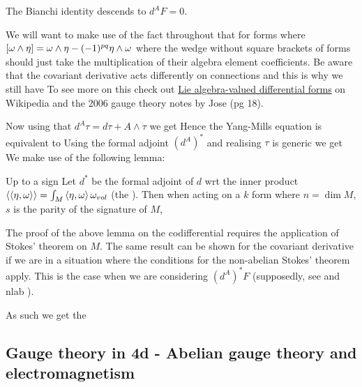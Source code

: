 \documentclass{article}
\begin{document}
\begin{corollary}
	The Bianchi identity descends to $d^A F = 0$. 
\end{corollary}

\begin{remark}
	We will want to make use of the fact throughout that for forms 
where $\left[ \omega \wedge \eta \right] = \omega \wedge \eta - (-1)^{pq} \eta \wedge \omega$ where the wedge without square brackets of forms should just take the multiplication of their algebra element coefficients. Be aware that the covariant derivative acts differently on connections and this is why we still have 
To see more on this check out \href{https://en.wikipedia.org/wiki/Lie_algebra-valued_differential_form}{Lie algebra-valued differential forms} on Wikipedia and the 2006 gauge theory notes by Jose (pg 18).  
\end{remark}
Now using that $d^A \tau  = d\tau + A \wedge \tau$ we get 
Hence the Yang-Mills equation is equivalent to 
Using the formal adjoint $(d^A)^\ast$ and realising $\tau$ is generic we get 
We make use of the following lemma:
\begin{lemma} Up to a sign 
	Let $d^\ast$ be the formal adjoint of $d$ wrt the inner product $\left\langle \left\langle \eta,\omega \right\rangle \right\rangle = \int_M \left\langle \eta,\omega \right\rangle \omega_{vol}$ (the ). Then when acting on a $k$ form 
where $n=\dim M$, $s$ is the parity of the signature of $M$, 
\end{lemma}
\begin{remark}
	The proof of the above lemma on the codifferential requires the application of Stokes' theorem on $M$. The same result can be shown for the covariant derivative if we are in a situation where the conditions for the non-abelian Stokes' theorem apply. This is the case when we are considering $(d^A)^\ast F$ (supposedly, see \cite{Schreiber2011} and nlab ).
\end{remark}
As such we get the 
\subsection{Gauge theory in 4d - Abelian gauge theory and electromagnetism}
\end{document}
